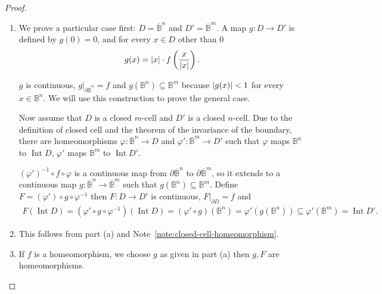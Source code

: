 \begin{proof}
	\begin{enumerate}[label={(\alph*)}]
		\item We prove a particular case first: \( D = \overline{\mathbb{B}}^{n} \) and \( D' = \overline{\mathbb{B}}^{m} \). A map \( g: D\to D' \) is defined by \( g(0) = 0 \), and for every \( x \in D \) other than 0
		      \begin{align*}
			      g(x) = \left\vert{x}\right\vert\cdot f\left(\frac{x}{\left\vert{x}\right\vert}\right).
		      \end{align*}

		      \( g \) is continuous, \( g\vert_{\partial \overline{\mathbb{B}}^{n}} = f \) and \( g(\mathbb{B}^{n}) \subseteq \mathbb{B}^{m} \) because \( \left\vert{g(x)}\right\vert < 1 \) for every \( x \in \mathbb{B}^{n} \). We will use this construction to prove the general case.

		      Now assume that \( D \) is a closed \( m \)-cell and \( D' \) is a closed \( n \)-cell. Due to the definition of closed cell and the theorem of the invariance of the boundary, there are homeomorphisms \( \varphi: \overline{\mathbb{B}}^{n} \to D \) and \( \varphi': \overline{\mathbb{B}}^{m} \to D' \) such that \( \varphi \) maps \( \mathbb{B}^{n} \) to \( \operatorname{Int} D \), \( \varphi' \) maps \( \mathbb{B}^{m} \) to \( \operatorname{Int} D' \).

		      \( {(\varphi')}^{-1}\circ f\circ \varphi \) is a continuous map from \( \partial \overline{\mathbb{B}}^{n} \) to \( \partial \overline{\mathbb{B}}^{m} \), so it extends to a continuous map \( g: \overline{\mathbb{B}}^{n} \to \overline{\mathbb{B}}^{m} \) such that \( g(\mathbb{B}^{n}) \subseteq \mathbb{B}^{m} \). Define \( F = {(\varphi')}\circ g\circ \varphi^{-1} \) then \( F: D \to D' \) is continuous, \( F\vert_{\partial D} = f \) and
		      \begin{align*}
			      F(\operatorname{Int} D) = (\varphi'\circ g\circ \varphi^{-1})(\operatorname{Int} D) = {(\varphi' \circ g)}(\mathbb{B}^{n}) = \varphi'(g(\mathbb{B}^{n})) \subseteq \varphi'(\mathbb{B}^{m}) = \operatorname{Int} D'.
		      \end{align*}
		\item This follows from part (a) and Note~\ref{note:closed-cell-homeomorphism}.
		\item If \( f \) is a homeomorphism, we choose \( g \) as given in part (a) then \( g, F \) are homeomorphisms.
	\end{enumerate}
\end{proof}

